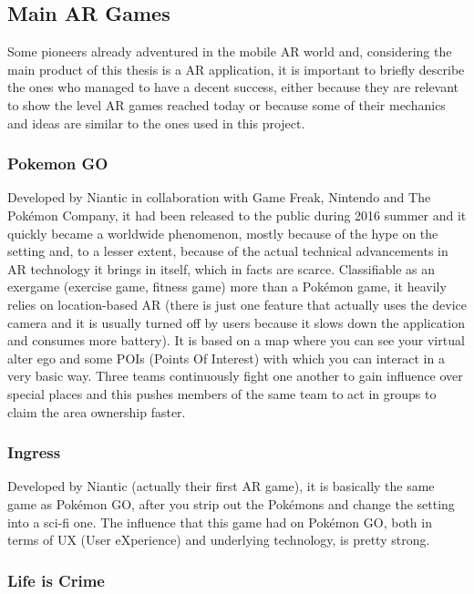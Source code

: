 		\subsection{Main AR Games}
		\label{soa:games}
		
			Some pioneers already adventured in the mobile AR world and, considering the main product of this thesis is a AR application, it is important to briefly describe the ones who managed to have a decent success, either because they are relevant to show the level AR games reached today or because some of their mechanics and ideas are similar to the ones used in this project.
		
			\subsubsection{Pokemon GO}
			
				Developed by Niantic in collaboration with Game Freak, Nintendo and The Pokémon Company, it had been released to the public during 2016 summer and it quickly became a worldwide phenomenon, mostly because of the hype on the setting and, to a lesser extent, because of the actual technical advancements in AR technology it brings in itself, which in facts are scarce.
				Classifiable as an exergame (exercise game, fitness game) more than a Pokémon game, it heavily relies on location-based AR (there is just one feature that actually uses the device camera and it is usually turned off by users because it slows down the application and consumes more battery). It is based on a map where you can see your virtual alter ego and some POIs (Points Of Interest) with which you can interact in a very basic way.
				Three teams continuously fight one another to gain influence over special places and this pushes members of the same team to act in groups to claim the area ownership faster.
			
			\subsubsection{Ingress}
			
				Developed by Niantic (actually their first AR game), it is basically the same game as Pokémon GO, after you strip out the Pokémons and change the setting into a sci-fi one.
				The influence that this game had on Pokémon GO, both in terms of UX (User eXperience) and underlying technology, is pretty strong.
			
			\subsubsection{Life is Crime}
			
